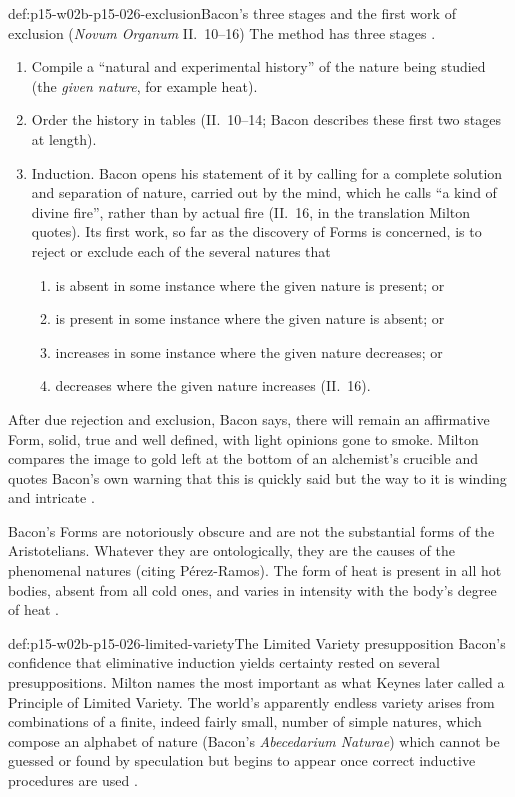 \begin{hbmethod}{def:p15-w02b-p15-026-exclusion}{Bacon's three stages and the first work of exclusion (\emph{Novum Organum} II.~10--16)}
The method has three stages \cite[p.~26]{Milton2011InductionBeforeHume}.
\begin{enumerate}
\item Compile a ``natural and experimental history'' of the nature being
  studied (the \emph{given nature}, for example heat).
\item Order the history in tables (II.~10--14; Bacon describes these first
  two stages at length).
\item Induction. Bacon opens his statement of it by calling for a
  complete solution and separation of nature, carried out by the mind, which he calls
  ``a kind of divine fire'', rather than by actual fire (II.~16, in the
  translation Milton quotes). Its first work, so far as the discovery of
  Forms is concerned, is to reject or exclude each of the several natures that
  \begin{enumerate}
  \item is absent in some instance where the given nature is present; or
  \item is present in some instance where the given nature is absent; or
  \item increases in some instance where the given nature decreases; or
  \item decreases where the given nature increases (II.~16).
  \end{enumerate}
\end{enumerate}
After due rejection and exclusion, Bacon says, there will remain an
affirmative Form, solid, true and well defined, with light opinions gone
to smoke. Milton compares the image to gold left at the bottom of an
alchemist's crucible and quotes Bacon's own warning that this is quickly
said but the way to it is winding and intricate
\cite[pp.~26--27]{Milton2011InductionBeforeHume}.
\end{hbmethod}

Bacon's Forms are notoriously obscure and are not the substantial forms
of the Aristotelians. Whatever they are ontologically, they are the causes
of the phenomenal natures (citing P\'erez-Ramos). The form of heat is
present in all hot bodies, absent from all cold ones, and varies in
intensity with the body's degree of heat
\cite[p.~26]{Milton2011InductionBeforeHume}.

\begin{hbdefinition}{def:p15-w02b-p15-026-limited-variety}{The Limited Variety presupposition}
Bacon's confidence that eliminative induction yields certainty rested on
several presuppositions. Milton names the most important as what Keynes
later called a Principle of Limited Variety. The world's apparently endless
variety arises from combinations of a finite, indeed fairly small, number
of simple natures, which compose an alphabet of nature (Bacon's
\emph{Abecedarium Naturae}) which cannot be guessed or found by
speculation but begins to appear once correct inductive procedures are
used \cite[p.~27, n.~17]{Milton2011InductionBeforeHume}.
\end{hbdefinition}

